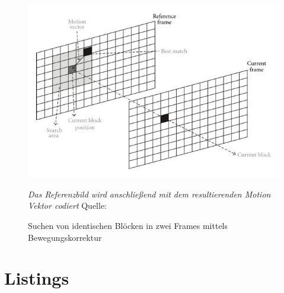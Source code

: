 \begin{figure}[h!]
    \centering
    \includegraphics[scale=3]{images/3-2-3_motionCompensation.jpg}
    \caption{Suchen von identischen Blöcken in zwei Frames mittels Bewegungskorrektur}
    \textit{Das Referenzbild wird anschließend mit dem resultierenden Motion Vektor codiert}
    Quelle: \cite{lopes_memory_2012}
    \label{fig:motionCompensation}
\end{figure}

\chapter{Listings}


\newpage



